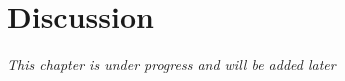 
\chapter{Discussion}

\textit{This chapter is under progress and will be added later}

\cleardoublepage